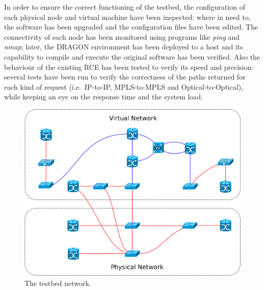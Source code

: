 \documentclass[10pt,a4paper]{report}
\begin{document}
In order to ensure the correct functioning of the testbed, the
configuration of each physical node and virtual machine have been
inspected: where in need to, the software has been upgraded and the
configuration files have been edited. The connectivity of each node
has been monitored using programs like \textit{ping} and
\textit{nmap}; later, the DRAGON environment has been deployed to a
host and its capability to compile and execute the original software
has been verified. Also the behaviour of the existing RCE has been
tested to verify its speed and precision: several tests have been run
to verify the correctness of the paths returned for each kind of
request (i.e.\ IP-to-IP, MPLS-to-MPLS and Optical-to-Optical), while
keeping an eye on the response time and the system load.

\begin{figure}[!htbp]
  \begin{center}
    \includegraphics[width=1\textwidth]{img/testbed_model}
    \caption[Testbed representation]{The testbed network.}
    \label{fig:testbed_model}
  \end{center}
\end{figure}
 
\end{document}

